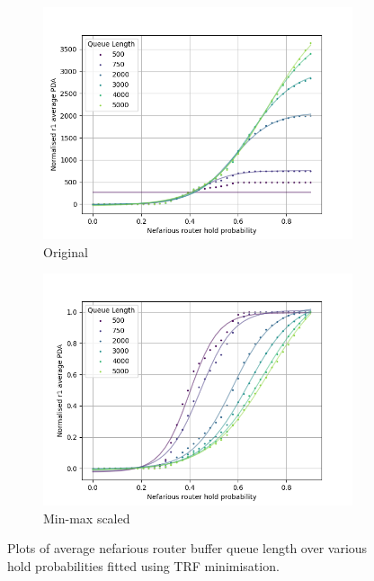   \label{Aaltcurvefit}
\begin{figure}[H]
    \centering
    \begin{subfigure}{0.475\textwidth}
        \includegraphics[width=\textwidth]{figs/results/qlen_fitting/qlen_PDA_trf.png}
        \caption{Original}
    \end{subfigure}
    \begin{subfigure}{0.475\textwidth}
        \includegraphics[width=\textwidth]{figs/results/qlen_fitting/norm_qlen_PDA_trf.png}
        \caption{Min-max scaled}
    \end{subfigure}
    \caption{Plots of average nefarious router buffer queue length over various hold probabilities fitted using TRF minimisation.}
\end{figure}

